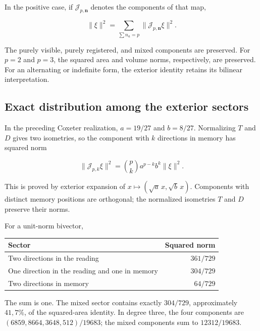 In the positive case, if \(\mathcal J_{p,\mathbf n}\) denotes the components of that map,



\begin{equation}
\boxed{\|\xi\|^2=\sum_{\sum n_a=p}
\|\mathcal J_{p,\mathbf n}\xi\|^2.}
\label{x_reciprocidad:nuc11:eq:21}
\end{equation}



The purely visible, purely registered, and mixed components are preserved. For \(p=2\) and \(p=3\), the squared area and volume norms, respectively, are preserved. For an alternating or indefinite form, the exterior identity retains its bilinear interpretation.

\subsection{Exact distribution among the exterior sectors}

In the preceding Coxeter realization, \(a=19/27\) and \(b=8/27\). Normalizing \(T\) and \(D\) gives two isometries, so the component with \(k\) directions in memory has squared norm



\begin{equation}
\boxed{
\|\mathcal J_{p,k}\xi\|^2=
\binom pk a^{p-k}b^k\|\xi\|^2.
}
\label{x_reciprocidad:nuc11:eq:22}
\end{equation}



This is proved by exterior expansion of \(x\mapsto(\sqrt a\,x,\sqrt b\,x)\). Components with distinct memory positions are orthogonal; the normalized isometries \(T\) and \(D\) preserve their norms.

For a unit-norm bivector,

\begin{center}
\begin{tabular}{@{}lr@{}}
\toprule
Sector & Squared norm\\
\midrule
Two directions in the reading & \(361/729\)\\
One direction in the reading and one in memory & \(304/729\)\\
Two directions in memory & \(64/729\)\\
\bottomrule
\end{tabular}
\end{center}

The sum is one. The mixed sector contains exactly \(304/729\), approximately \(41{,}7\%\), of the squared-area identity. In degree three, the four components are \((6859,8664,3648,512)/19683\); the mixed components sum to \(12312/19683\).

